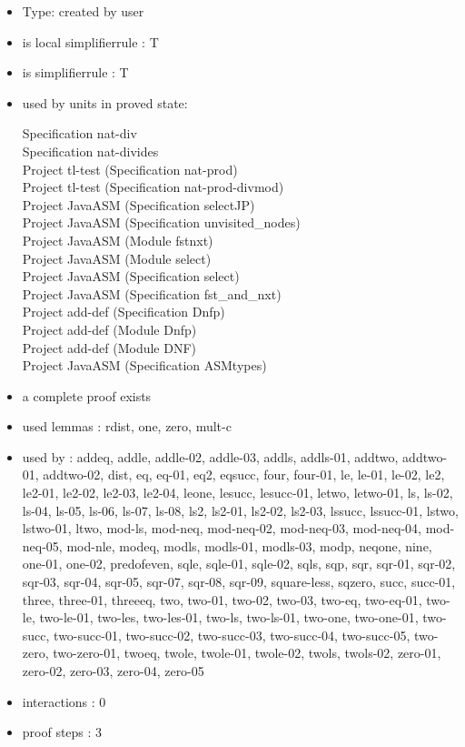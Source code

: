 \documentclass[a4paper]{article}
\begin{document}
\begin{itemize}

\item Type: created by user

\item is local simplifierrule : T
\item is simplifierrule : T
\item used by units in proved state:

Specification nat-div \\
Specification nat-divides \\
Project tl-test (Specification nat-prod) \\
Project tl-test (Specification nat-prod-divmod) \\
Project JavaASM (Specification selectJP) \\
Project JavaASM (Specification unvisited\_nodes) \\
Project JavaASM (Module fstnxt) \\
Project JavaASM (Module select) \\
Project JavaASM (Specification select) \\
Project JavaASM (Specification fst\_and\_nxt) \\
Project add-def (Specification Dnfp) \\
Project add-def (Module Dnfp) \\
Project add-def (Module DNF) \\
Project JavaASM (Specification ASMtypes)
\item       a complete proof exists
\item       used lemmas  : rdist, one, zero, mult-c
\item       used by      : addeq, addle, addle-02, addle-03, addls, addls-01, addtwo, addtwo-01, addtwo-02, dist, eq, eq-01, eq2, eqsucc, four, four-01, le, le-01, le-02, le2, le2-01, le2-02, le2-03, le2-04, leone, lesucc, lesucc-01, letwo, letwo-01, ls, ls-02, ls-04, ls-05, ls-06, ls-07, ls-08, ls2, ls2-01, ls2-02, ls2-03, lssucc, lssucc-01, lstwo, lstwo-01, ltwo, mod-ls, mod-neq, mod-neq-02, mod-neq-03, mod-neq-04, mod-neq-05, mod-nle, modeq, modls, modls-01, modls-03, modp, neqone, nine, one-01, one-02, predofeven, sqle, sqle-01, sqle-02, sqls, sqp, sqr, sqr-01, sqr-02, sqr-03, sqr-04, sqr-05, sqr-07, sqr-08, sqr-09, square-less, sqzero, succ, succ-01, three, three-01, threeeq, two, two-01, two-02, two-03, two-eq, two-eq-01, two-le, two-le-01, two-les, two-les-01, two-ls, two-ls-01, two-one, two-one-01, two-succ, two-succ-01, two-succ-02, two-succ-03, two-succ-04, two-succ-05, two-zero, two-zero-01, twoeq, twole, twole-01, twole-02, twols, twols-02, zero-01, zero-02, zero-03, zero-04, zero-05
\item       interactions : 0
\item       proof steps  : 3
\end{itemize}
\end{document}
